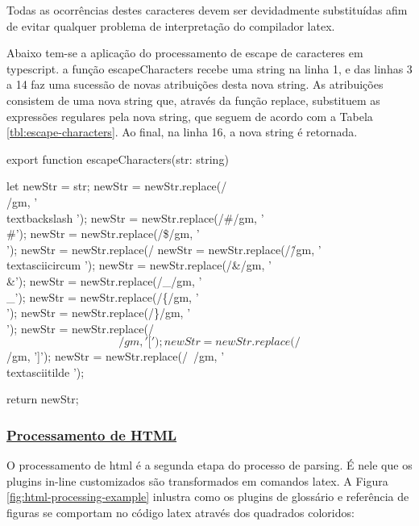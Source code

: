 Todas as ocorrências destes caracteres devem ser devidadmente
substituídas afim de evitar qualquer problema de interpretação do
compilador
\acrshort{latex}.


Abaixo tem-se a aplicação do processamento de escape de caracteres
em typescript. a função escapeCharacters recebe uma string na linha 1,
e das linhas 3 a 14 faz uma sucessão de novas atribuições desta nova string.
As atribuições consistem de uma nova string que, através da função replace,
substituem as expressões regulares pela nova string, que seguem de acordo
com a
Tabela \ref{tbl:escape-characters}.
Ao final, na linha 16, a nova string é retornada.

\begin{codeEscape}
export function escapeCharacters(str: string){
    let newStr = str;
    newStr = newStr.replace(/\\/gm, '\\textbackslash ');
    newStr = newStr.replace(/#/gm, '\\#');
    newStr = newStr.replace(/\$/gm, '\\$$');
    newStr = newStr.replace(/%
    newStr = newStr.replace(/\^/gm, '\\textasciicircum ');
    newStr = newStr.replace(/&/gm, '\\&');
    newStr = newStr.replace(/_/gm, '\\_');
    newStr = newStr.replace(/\{/gm, '\\{');
    newStr = newStr.replace(/\}/gm, '\\}');
    newStr = newStr.replace(/\[/gm, '{[}');
    newStr = newStr.replace(/\]/gm, '{]}');
    newStr = newStr.replace(/~/gm, '\\textasciitilde ');

    return newStr;
}
\end{codeEscape}

\subsubsection{\underline{Processamento de HTML}}

O processamento de
\acrshort{html}
é a segunda etapa do processo de parsing. É
nele que os plugins in-line customizados são transformados
em comandos
\acrshort{latex}.
A
Figura \ref{fig:html-processing-example}
inlustra como os plugins de glossário e referência de figuras
se comportam no código
\acrshort{latex}
através dos quadrados coloridos:

